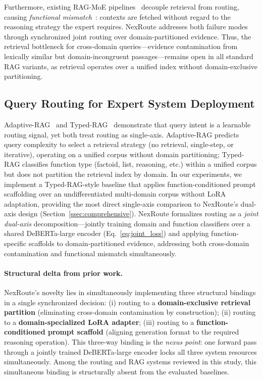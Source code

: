 \documentclass[a4paper,fleql,doubleblind]{cas-sc}
\begin{document}
Furthermore, existing RAG-MoE pipelines~\citep{jeong2024adaptiverag,dou2024loramoe} decouple retrieval from routing, causing \emph{functional mismatch}~\citep{hu2024routerbench}: contexts are fetched without regard to the reasoning strategy the expert requires. NexRoute addresses both failure modes through synchronized joint routing over domain-partitioned evidence.
Thus, the retrieval bottleneck for cross-domain queries---evidence contamination from lexically similar but domain-incongruent passages---remains open in all standard RAG variants, as retrieval operates over a unified index without domain-exclusive partitioning.

\subsection{Query Routing for Expert System Deployment}
Adaptive-RAG~\citep{jeong2024adaptiverag} and Typed-RAG~\citep{typedrag} demonstrate that query intent is a learnable routing signal, yet both treat routing as single-axis. Adaptive-RAG predicts query complexity to select a retrieval strategy (no retrieval, single-step, or iterative), operating on a unified corpus without domain partitioning; Typed-RAG classifies function type (factoid, list, reasoning, etc.) within a unified corpus but does not partition the retrieval index by domain. In our experiments, we implement a Typed-RAG-style baseline that applies function-conditioned prompt scaffolding over an undifferentiated multi-domain corpus without LoRA adaptation, providing the most direct single-axis comparison to NexRoute's dual-axis design (Section~\ref{ssec:comprehensive}). NexRoute formalizes routing as a \emph{joint dual-axis} decomposition---jointly training domain and function classifiers over a shared DeBERTa-large encoder (Eq.~\ref{eq:joint_loss}) and applying function-specific scaffolds to domain-partitioned evidence, addressing both cross-domain contamination and functional mismatch simultaneously.

\paragraph{Structural delta from prior work.}
NexRoute's novelty lies in simultaneously implementing three structural bindings in a single synchronized decision:
(i) routing to a \textbf{domain-exclusive retrieval partition} (eliminating cross-domain contamination by construction);
(ii) routing to a \textbf{domain-specialized LoRA adapter};
(iii) routing to a \textbf{function-conditioned prompt scaffold} (aligning generation format to the required reasoning operation).
This three-way binding is the \emph{nexus point}: one forward pass through a jointly trained DeBERTa-large encoder locks all three system resources simultaneously.
Among the routing and RAG systems reviewed in this study, this simultaneous binding is structurally absent from the evaluated baselines.
\end{document}
